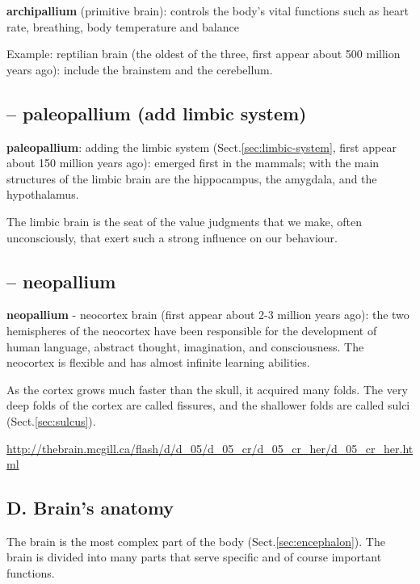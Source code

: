 {\bf archipallium} (primitive brain): controls the body's vital 
  functions such as heart rate, breathing, body temperature and balance

  
Example: reptilian brain (the oldest of the three, first appear about 500
million years ago):  include the brainstem and the cerebellum. 
  
\subsection{-- paleopallium (add limbic system)}
\label{sec:paleopallium}

{\bf paleopallium}:  adding the limbic system (Sect.\ref{sec:limbic-system},
first appear about 150 million years ago):  emerged first in the mammals; with
the main structures of the limbic brain are the hippocampus, the amygdala, and
the hypothalamus.
  
The limbic brain is the seat of the value judgments that we make, often
unconsciously, that exert such a strong influence on our behaviour.

\subsection{-- neopallium}
\label{sec:neopallium}
  
{\bf neopallium} - neocortex brain (first appear about 2-3 million years
  ago):   the two hemispheres of the neocortex have been responsible for the
  development of human language, abstract thought, imagination, and consciousness.
  The neocortex is flexible and has almost infinite learning abilities.
  
  As the cortex grows much faster than the skull, it acquired many folds. The
  very deep folds of the cortex are called fissures, and the shallower folds are
  called sulci (Sect.\ref{sec:sulcus}).

\url{http://thebrain.mcgill.ca/flash/d/d_05/d_05_cr/d_05_cr_her/d_05_cr_her.html}


\subsection{D. Brain's anatomy}
\label{sec:brain-anatomy}
\label{sec:coronal-plane}
\label{sec:hirozontal-plane}
\label{sec:sagittal-plane}

The brain is the most complex part of the body (Sect.\ref{sec:encephalon}). The
brain is divided into many parts that serve specific and of course important
functions.

